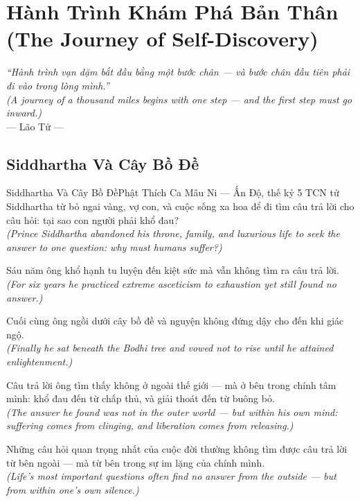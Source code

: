 \chapter{Hành Trình Khám Phá Bản Thân (The Journey of Self-Discovery)}
\begin{center}
  \textit{\color{truyengold}``Hành trình vạn dặm bắt đầu bằng một bước chân --- và bước chân đầu tiên phải đi vào trong lòng mình.''}\\[4pt]
  \textit{(A journey of a thousand miles begins with one step --- and the first step must go inward.)}\\[4pt]
  \small\color{truyenblue}--- Lão Tử ---
\end{center}
\ngancach

\section{Siddhartha Và Cây Bồ Đề}
\begin{truyen}{Siddhartha Và Cây Bồ Đề}{Phật Thích Ca Mâu Ni --- Ấn Độ, thế kỷ 5 TCN}
 tử Siddhartha từ bỏ ngai vàng, vợ con, và cuộc sống xa hoa để đi tìm câu trả lời cho câu hỏi: tại sao con người phải khổ đau?\\[4pt]
\textit{(Prince Siddhartha abandoned his throne, family, and luxurious life to seek the answer to one question: why must humans suffer?)}

Sáu năm ông khổ hạnh tu luyện đến kiệt sức mà vẫn không tìm ra câu trả lời.\\[4pt]
\textit{(For six years he practiced extreme asceticism to exhaustion yet still found no answer.)}

Cuối cùng ông ngồi dưới cây bồ đề và nguyện không đứng dậy cho đến khi giác ngộ.\\[4pt]
\textit{(Finally he sat beneath the Bodhi tree and vowed not to rise until he attained enlightenment.)}

Câu trả lời ông tìm thấy không ở ngoài thế giới --- mà ở bên trong chính tâm mình: khổ đau đến từ chấp thủ, và giải thoát đến từ buông bỏ.\\[4pt]
\textit{(The answer he found was not in the outer world --- but within his own mind: suffering comes from clinging, and liberation comes from releasing.)}

\end{truyen}
\begin{baihoc}
  Những câu hỏi quan trọng nhất của cuộc đời thường không tìm được câu trả lời từ bên ngoài --- mà từ bên trong sự im lặng của chính mình.\\[4pt]
  \textit{(Life's most important questions often find no answer from the outside --- but from within one's own silence.)}
\end{baihoc}

